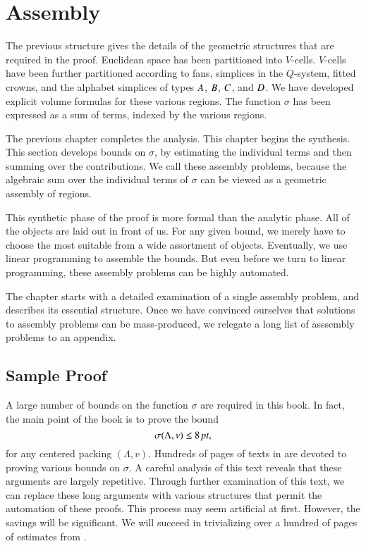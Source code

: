

\chapter{Assembly}
\label{sec:assembly}

The previous structure gives the details of the geometric structures
that are required in the proof.  Euclidean space has been partitioned
into  $V$-cells.  $V$-cells have been further partitioned according
to fans, simplices in the $Q$-system, fitted crowns, and
the alphabet simplices
of types $A$, $B$, $C$, and $D$.   We have developed explicit
volume formulas for these various regions.  The function $\sigma$
has been expressed as a sum of terms, indexed by the various regions.

The previous chapter completes the analysis.  This chapter begins the
synthesis.
This section develops bounds on $\sigma$, by estimating the individual
terms and then summing over the contributions.  We call these assembly
problems, because the 
algebraic sum over the individual terms of $\sigma$
can be viewed as a geometric assembly of regions.

This synthetic phase of the proof is more formal than the analytic phase.
All of the objects are laid out in front of us.  For any given bound, 
we merely have to choose the most suitable
from a wide assortment of objects.  Eventually, we use linear programming
to assemble the bounds.  But even before we turn to linear programming,
these assembly problems can be highly automated.

The chapter starts with a detailed examination of a single assembly
problem, and describes its essential structure.  Once we have convinced
ourselves that solutions to assembly problems can be mass-produced,
we relegate a long list of asssembly problems to an appendix.


\section{Sample Proof}

A large number of bounds on the function
$\sigma$ are required in this book.  In fact, the main
point of the book is to prove the bound
  $$
  \sigma(\Lambda,v)\le 8\,\hbox{\it pt},
  $$
for any centered packing $(\Lambda,v)$.
Hundreds of pages of texts in \cite{DCG} are devoted to
proving various bounds on $\sigma$.  A careful analysis of
this text reveals that these arguments are largely repetitive.
Through further examination of this text, we can replace these
long arguments with various structures that permit the automation
of these proofs.  This process may seem artificial at first.
However, the savings will be significant.  We will succeed in
trivializing over a hundred of pages of estimates from \cite{DCG}.


